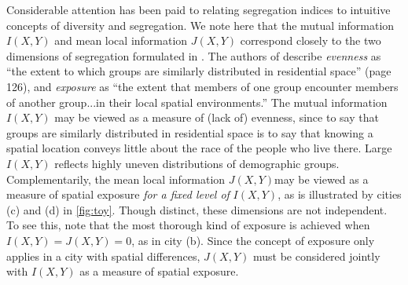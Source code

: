 	Considerable attention has been paid to relating segregation indices to intuitive concepts of diversity and segregation. We note here that the mutual information $I(X,Y)$ and mean local information $J(X,Y)$ correspond closely to the two dimensions of segregation formulated in \cite{Reardon2002}. The authors of \cite{Reardon2002} describe \emph{evenness} as ``the extent to which groups are similarly distributed in residential space'' (page 126), and \emph{exposure} as ``the extent that members of one group encounter members of another group...in their local spatial environments.'' The mutual information $I(X,Y)$ may be viewed as a measure of (lack of) evenness, since to say that groups are similarly distributed in residential space is to say that knowing a spatial location conveys little about the race of the people who live there. Large $I(X,Y)$ reflects highly uneven distributions of demographic groups. Complementarily, the mean local information $J(X,Y)$may be viewed as a measure of spatial exposure \emph{for a fixed level of} $I(X,Y)$, as is illustrated by cities (c) and (d) in \ref{fig:toy}. Though distinct, these dimensions are not independent. To see this, note that the most thorough kind of exposure is achieved when $I(X,Y) = J(X,Y) = 0$, as in city (b). Since the concept of exposure only applies in a city with spatial differences, $J(X,Y)$ must be considered jointly with $I(X,Y)$ as a measure of spatial exposure. 

